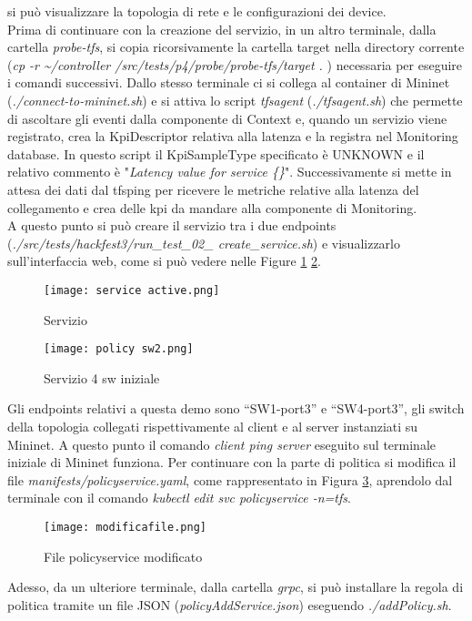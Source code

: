 si può visualizzare la topologia di rete e le configurazioni dei device.
\\Prima di continuare con la creazione del servizio, in un altro terminale, dalla cartella
\textit{probe-tfs}, si copia ricorsivamente la cartella target nella directory corrente (\textit{cp -r \textasciitilde /controller /src/tests/p4/probe/probe-tfs/target . })
necessaria per eseguire i comandi successivi.
Dallo stesso terminale ci si collega al container di Mininet (\textit{./connect-to-mininet.sh}) e
si attiva lo script \textit{tfsagent} (\textit{./tfsagent.sh}) che permette di ascoltare gli eventi dalla componente di Context e, 
quando un servizio viene registrato, crea la KpiDescriptor relativa alla latenza e la registra nel Monitoring database.
In questo script il KpiSampleType specificato è UNKNOWN e il relativo commento è "\textit{Latency value for service \{\}}".
Successivamente si mette in attesa dei dati dal tfsping per ricevere le metriche relative alla latenza del collegamento e crea delle kpi da mandare alla componente di Monitoring.
\\A questo punto si può creare il servizio tra i due endpoints (\textit{./src/tests/hackfest3/run\_test\_02\_ create\_service.sh}) e visualizzarlo sull'interfaccia web, come si può vedere nelle Figure \ref{fig:ser} \ref{fig:sw4}.
\begin{figure}[h]
    \centering
    \texttt{[image: service active.png]}
    \caption{Servizio}
    \label{fig:ser}
\end{figure}
\begin{figure}[h]
    \centering
    \texttt{[image: policy sw2.png]}
    \caption{Servizio 4 sw iniziale}
    \label{fig:sw4}
\end{figure}
Gli endpoints relativi a questa demo sono “SW1-port3” e “SW4-port3”, 
gli switch della topologia collegati rispettivamente al client e al server instanziati su Mininet.
A questo punto il comando \textit{client ping server} eseguito sul terminale iniziale di Mininet funziona.
Per continuare con la parte di politica si modifica il file \textit{manifests/policyservice.yaml}, come rappresentato in Figura \ref{fig:pol}, aprendolo dal terminale con il comando \textit{kubectl edit svc policyservice -n=tfs}.
\begin{figure}[h]
    \centering
    \texttt{[image: modificafile.png]}
    \caption{File policyservice modificato}
    \label{fig:pol}
\end{figure}
Adesso, da un ulteriore terminale, dalla cartella \textit{grpc}, si può installare la regola di politica tramite un file JSON (\textit{policyAddService.json}) eseguendo \textit{./addPolicy.sh}.
